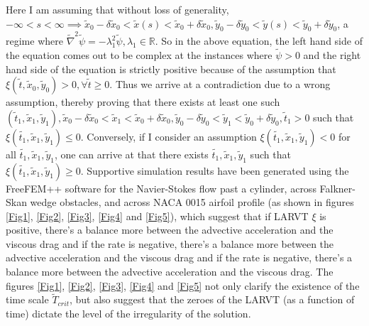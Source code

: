 \documentclass{article}
\begin{document}
Here I am assuming that without loss of generality, $-\infty<s<\infty \implies \tilde{x}_0-\delta\tilde{x}_0<\tilde{x}(s)<\tilde{x}_0+\delta\tilde{x}_0, \tilde{y}_0-\delta\tilde{y}_0<\tilde{y}(s)<\tilde{y}_0+\delta\tilde{y}_0$, a regime where $\tilde{\nabla}^2 \tilde{\psi} = -\lambda_1^2 \tilde{\psi}, \lambda_1 \in \mathbb{R}$. So in the above equation, the left hand side of the equation comes out to be complex at the instances where $\tilde{\psi} > 0$ and the right hand side of the equation is strictly positive because of the assumption that $\xi(\tilde{t}, \tilde{x}_0,\tilde{y}_0) > 0, \forall \tilde{t}\ge0$. Thus we arrive at a contradiction due to a wrong assumption, thereby proving that there exists at least one such $(\tilde{t}_1, \tilde{x}_1,\tilde{y}_1), \tilde{x}_0-\delta\tilde{x}_0<\tilde{x}_1<\tilde{x}_0+\delta\tilde{x}_0, \tilde{y}_0-\delta\tilde{y}_0<\tilde{y}_1<\tilde{y}_0+\delta\tilde{y}_0, \tilde{t}_1 > 0$ such that $\xi(\tilde{t_1}, \tilde{x}_1,\tilde{y}_1) \le 0$. Conversely, if I consider an assumption $\xi(\tilde{t_1}, \tilde{x}_1,\tilde{y}_1) < 0$ for all $\tilde{t_1}, \tilde{x}_1,\tilde{y}_1$, one can arrive at that there exists $\tilde{t_1}, \tilde{x}_1,\tilde{y}_1$ such that $\xi(\tilde{t_1}, \tilde{x}_1,\tilde{y}_1) \ge 0$. Supportive simulation results have been generated using the FreeFEM++ software for the Navier-Stokes flow past a cylinder, across Falkner-Skan wedge obstacles, and across NACA 0015 airfoil profile (as shown in figures \ref{Fig1}, \ref{Fig2}, \ref{Fig3}, \ref{Fig4} and \ref{Fig5}), which suggest that if LARVT $\xi$ is positive, there's a balance more between the advective acceleration and the viscous drag and if the rate is negative, there's a balance more between the advective acceleration and the viscous drag and if the rate is negative, there's a balance more between the advective acceleration and the viscous drag. The figures \ref{Fig1}, \ref{Fig2}, \ref{Fig3}, \ref{Fig4} and \ref{Fig5} not only clarify the existence of the time scale $\tilde{T}_{crit}$, but also suggest that the zeroes of the LARVT (as a function of time) dictate the level of the irregularity of the solution. \\ \\
\end{document}
